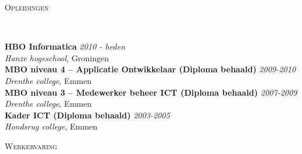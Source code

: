 \documentclass[9pt]{article}
\newenvironment{changemargin}[2]{%
  \begin{list}{}{%
    \setlength{\topsep}{0pt}%
    \setlength{\leftmargin}{#1}%
    \setlength{\rightmargin}{#2}%
    \setlength{\listparindent}{\parindent}%
    \setlength{\itemindent}{\parindent}%
    \setlength{\parsep}{\parskip}%
  }%
  \item[]}{\end{list}
}
\newcommand{\lineover}{
	\begin{changemargin}{-0.05in}{-0.05in}
		\vspace*{-8pt}
		\hrulefill \\
		\vspace*{-2pt}
	\end{changemargin}
}
\newcommand{\header}[1]{
	\begin{changemargin}{-0.5in}{-0.5in}
		\scshape{#1}\\
  	\lineover
	\end{changemargin}
}
\newenvironment{body} {
	\vspace*{-16pt}
	\begin{changemargin}{-0.25in}{-0.5in}
  }	
	{\end{changemargin}
}
\begin{document}
\smallskip
\header{Opleidingen}
\begin{body}
	\vspace{14pt}
	\textbf{HBO Informatica}{} \hfill \emph{2010 - heden }{} \\
	\emph{Hanze hogeschool}, Groningen{} \\
  \medskip
	\textbf{MBO niveau 4 -- Applicatie Ontwikkelaar (Diploma behaald)} \hfill \emph{2009-2010} \\
	\emph{Drenthe college}, Emmen{}\\
  \medskip
	\textbf{MBO niveau 3 -- Medewerker beheer ICT (Diploma behaald)} \hfill \emph{2007-2009} \\
	\emph{Drenthe college}, Emmen{}\\
  \medskip
	\textbf{Kader ICT (Diploma behaald)} \hfill \emph{2003-2005} \\
	\emph{Hondsrug college}, Emmen{}\\
\end{body}

\smallskip



\header{Werkervaring}
\end{document}
